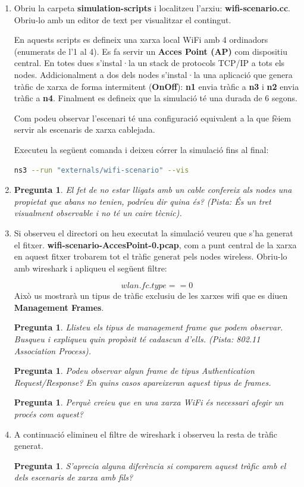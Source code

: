 \documentclass[12pt,a4paper]{article}
\newcounter{exercises}
\newtheorem{exer}[exercises]{Pregunta}
\begin{document}
\begin{enumerate}

\item Obriu la carpeta \textbf{simulation-scripts} i localitzeu l'arxiu: \textbf{wifi-scenario.cc}. Obriu-lo amb un editor de text per visualitzar el contingut.

En aquests scripts es defineix una xarxa local WiFi amb 4 ordinadors (enumerats de l'1 al 4).
Es fa servir un \textbf{Acces Point (AP)} com dispositiu central. En totes dues s'instal·la un stack de protocols TCP/IP a tots els nodes.
Addicionalment a dos dels nodes s'instal·la una aplicació que genera tràfic de xarxa de forma intermitent (\textbf{OnOff}):
\textbf{n1} envia tràfic a \textbf{n3} i \textbf{n2} envia tràfic a \textbf{n4}.
Finalment es defineix que la simulació té una durada de 6 segons.

Com podeu observar l'escenari té una configuració equivalent a la que fèiem servir als escenaris de xarxa cablejada.

Executeu la següent comanda i deixeu córrer la simulació fins al final:
\begin{lstlisting}[language=bash]
   ns3 --run "externals/wifi-scenario" --vis
\end{lstlisting}

 \item \begin{exer} El fet de no estar lligats amb un cable confereix als nodes una propietat que abans no tenien, podríeu dir quina és?
(Pista: És un tret visualment observable i no té un caire tècnic). \end{exer}

\item Si observeu el directori on heu executat la simulació veureu que s'ha generat el fitxer. \textbf{wifi-scenario-AccesPoint-0.pcap}, com a punt
central de la xarxa en aquest fitxer trobarem tot el tràfic generat pels nodes wireless. Obriu-lo amb wireshark i apliqueu el següent filtre:

$$ wlan.fc.type == 0 $$ 
Això us mostrarà un tipus de tràfic exclusiu de les xarxes wifi que es diuen \textbf{Management Frames}.
\begin{exer} Llisteu els tipus de management frame que podem observar. Busqueu i expliqueu quin propòsit té cadascun d'ells. (Pista: 802.11 Association Process). \end{exer}
\begin{exer} Podeu observar algun frame de tipus Authentication Request/Response? En quins casos apareixeran aquest tipus de frames.\end{exer}
\begin{exer} Perquè creieu que en una xarxa WiFi és necessari afegir un procés com aquest? \end{exer}
\item A continuació elimineu el filtre de wireshark i observeu la resta de tràfic generat.
\begin{exer} S'aprecia alguna diferència si comparem aquest tràfic amb el dels escenaris de xarxa amb fils? \end{exer}

\end{enumerate}
\end{document}
